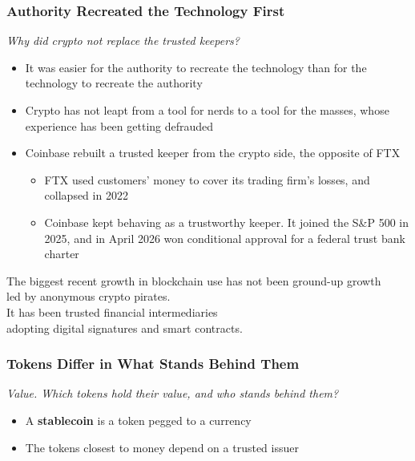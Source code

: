 \documentclass[aspectratio=169]{beamer}
\newcommand{\lead}[1]{{\small\itshape\textcolor{gtnavy!80}{#1}}\par\vspace{1.5mm}}
\newcommand{\bi}{\begin{itemize}}
\newcommand{\ei}{\end{itemize}}
\newcommand{\m}{\item}
\begin{document}
\begin{frame}[label=main-authority]
\frametitle{Authority Recreated the Technology First}
\lead{Why did crypto not replace the trusted keepers?}

\bi
\m It was easier for the authority to recreate the technology than for the technology to recreate the authority
\m Crypto has not leapt from a tool for nerds to a tool for the masses, whose experience has been getting defrauded
\m Coinbase rebuilt a trusted keeper from the crypto side, the opposite of FTX
\bi
\m FTX used customers' money to cover its trading firm's losses, and collapsed in 2022
\m Coinbase kept behaving as a trustworthy keeper. It joined the S\&P 500 in 2025, and in April 2026 won conditional approval for a federal trust bank charter
\ei
\ei
\vspace{1mm}
The biggest recent growth in blockchain use has not been ground-up growth\\
led by anonymous crypto pirates.\\[2mm]
It has been trusted financial intermediaries\\
adopting digital signatures and smart contracts.
\par\vspace{0pt plus 1fill}\hfill{\scriptsize \hyperlink{appx-incumbents}{}}
\end{frame}


\begin{frame}[label=main-tokens]
\frametitle{Tokens Differ in What Stands Behind Them}
\lead{Value. Which tokens hold their value, and who stands behind them?}

\begin{center}
\end{center}
\bi
\m A \textbf{stablecoin} is a token pegged to a currency
\m The tokens closest to money depend on a trusted issuer
\ei
\end{frame}
\end{document}
